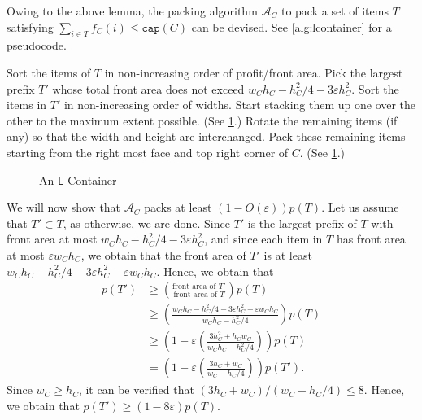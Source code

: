 \documentclass[10pt,a4paper]{amsart}
\newcommand{\eps}{\varepsilon}
\theoremstyle{definition}
\newcommand{\LContainer}{$\mathsf{L}$-Container}
\begin{document}
Owing to the above lemma, the packing algorithm $\mathcal A_C$ to pack a set of items $T$ satisfying $\sum_{i\in T}f_C(i)\le \mathtt{cap}(C)$ can be devised. See \cref{alg:lcontainer} for a pseudocode.
\begin{algorithm}[h]
    \caption{$\mathcal A_C$ for an \LContainer{} given an input set $T$ satisfying $f_C(T)\le \mathtt{cap}(C)$}
    \begin{algorithmic}[1]
        \State Sort the items of $T$ in non-increasing order of profit/front area.
        \State Pick the largest prefix $T'$ whose total front area does not exceed $w_C h_C-h_C^2/4-3\eps h_C^2$.
        \State Sort the items in $T'$ in non-increasing order of widths.
        \State Start stacking them up one over the other to the maximum extent possible. (See \cref{fig:l-container-2}.)
        \State Rotate the remaining items (if any) so that the width and height are interchanged.
        \State Pack these remaining items starting from the right most face and top right corner of $C$. (See \cref{fig:l-container-2}.)
    \end{algorithmic}
    \label{alg:lcontainer}
\end{algorithm}

\begin{figure}
    \centering
    
    \caption{An \LContainer}
    \label{fig:l-container-2}
\end{figure}

We will now show that $\mathcal A_C$ packs at least $(1-O(\eps))p(T)$.
Let us assume that $T'\subset T$, as otherwise, we are done. Since $T'$ is the largest prefix of $T$ with front area at most
$w_C h_C-h_C^2/4-3\eps h_C^2$, and since each item in $T$ has front area at most $\eps w_Ch_C$,
we obtain that the front area of $T'$ is at least $w_C h_C-h_C^2/4-3\eps h_C^2-\eps w_Ch_C$. Hence, we obtain that
\begin{align*}
    p(T')&\ge \left(\frac{\text{front area of }T'}{\text{front area of } T}\right)p(T)\\
        &\ge \left(\frac{w_C h_C-h_C^2/4-3\eps h_C^2-\eps w_Ch_C}{w_C h_C-h_C^2/4}\right)p(T)\\
        &\ge\left(1-\eps\left(\frac{3h_C^2+h_Cw_C}{w_Ch_C-h_C^2/4}\right)\right)p(T)\\
        &= \left(1-\eps\left(\frac{3h_C+w_C}{w_C-h_C/4}\right)\right)p(T').
\end{align*}
Since $w_C\ge h_C$, it can be verified that $(3h_C+w_C)/(w_C-h_C/4)\le 8$. Hence, we obtain that $p(T')\ge (1-8\eps)p(T)$.
\end{document}
